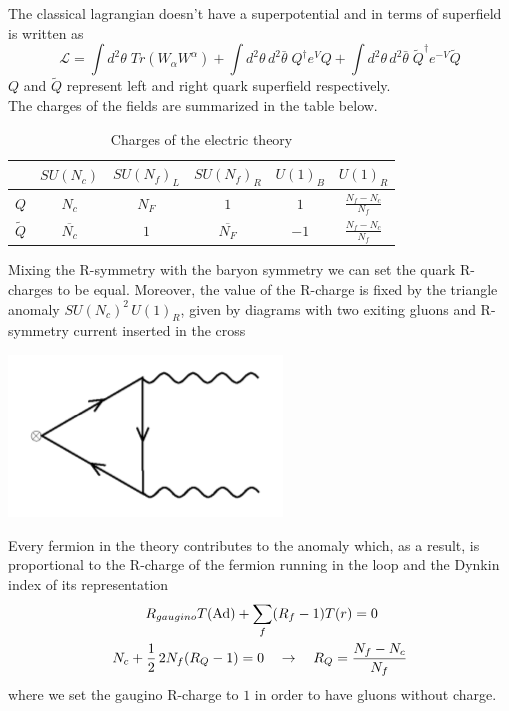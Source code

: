 The classical lagrangian doesn't have a superpotential and in terms of superfield is written as
\begin{equation}
 \mathcal{L} = \int d^2 \theta \; Tr ( W_{\alpha} W^{\alpha} ) + 
 \int d^2 \theta \, d^2 \bar{\theta} \;  {Q}^{\dagger} e^{ V} Q +
 \int d^2 \theta \, d^2 \bar{\theta} \; {\tilde{Q}^{\dagger}} e^{- V} \tilde{Q}
 \end{equation} 
$Q$ and $\tilde{Q}$ represent left and right quark superfield respectively.\\
The charges of the fields are summarized in the table below.
\begin{table}[h!]
 \begin{tabular}{c | c |  c c c c }
 & $SU(N_c) $& $SU(N_f)_L$  &$SU(N_f)_R $  & $U(1)_B$ &  $U(1)_R$ \\
\hline
$Q$ & $N_c$ & $N_F$ & $1$   &  $1$  & $ \frac{N_f - N_c}{N_f}$  \\
$\tilde{Q}$ &$\overline{N_c} $ &  $1$ & $\overline{ N_F}$   & $-1$   &  $\frac{N_f - N_c}{N_f}$   \\	 
 \end{tabular}
	\centering
 \caption{Charges of the electric theory}
\end{table}
Mixing the R-symmetry with the baryon symmetry we can set the quark R-charges to be equal.
Moreover, the value of the R-charge is fixed by the triangle anomaly $SU(N_c)^2 \, U(1)_R $, given by diagrams with two exiting gluons and R-symmetry current inserted in the cross 
\begin{center}
\includegraphics[scale=0.6]{r-symm_anomlay.png}
\end{center}
Every fermion in the theory contributes to the anomaly which, as a result, is proportional to the R-charge of the fermion running in the loop and the Dynkin index of its representation
\begin{align*}
R_{gaugino} T (\hbox{Ad}) + \sum_{ f} (& R_{f} - 1)  T(r)   = 0 \\
N_c + \frac{1}{2}\,  2 N_f (R_Q -1)  = 0 \quad & \rightarrow \quad R_Q = \frac{N_f - N_c}{N_f}
\end{align*}
where we set  the gaugino R-charge to $1$ in order to have gluons without charge.\\


